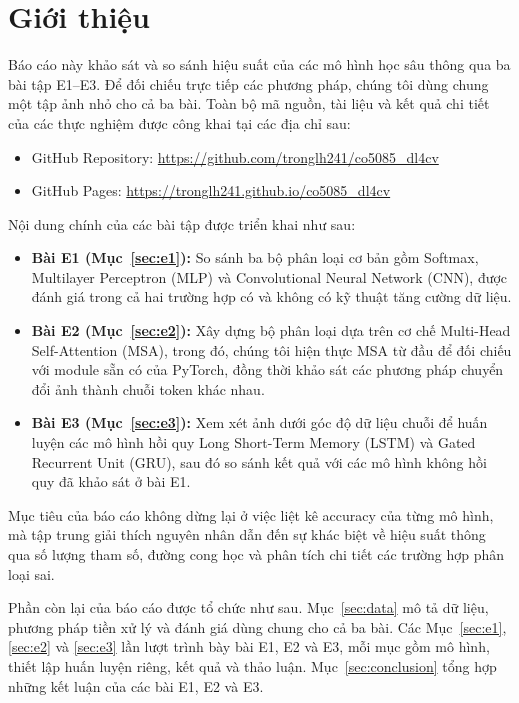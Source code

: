 \documentclass[a4paper,12pt]{article}
\begin{document}
\section{Giới thiệu}
\label{sec:intro}

Báo cáo này khảo sát và so sánh hiệu suất của các mô hình học sâu thông qua ba bài tập E1--E3. Để đối chiếu trực tiếp các phương pháp, chúng tôi dùng chung một tập ảnh nhỏ cho cả ba bài. Toàn bộ mã nguồn, tài liệu và kết quả chi tiết của các thực nghiệm được công khai tại các địa chỉ sau:
\begin{itemize}
    \item GitHub Repository: \url{https://github.com/tronglh241/co5085_dl4cv}
    \item GitHub Pages: \url{https://tronglh241.github.io/co5085_dl4cv}
\end{itemize}

Nội dung chính của các bài tập được triển khai như sau:
\begin{itemize}
    \item \textbf{Bài E1 (Mục~\ref{sec:e1}):} So sánh ba bộ phân loại cơ bản gồm Softmax, Multilayer Perceptron (MLP) và Convolutional Neural Network (CNN), được đánh giá trong cả hai trường hợp có và không có kỹ thuật tăng cường dữ liệu.
    \item \textbf{Bài E2 (Mục~\ref{sec:e2}):} Xây dựng bộ phân loại dựa trên cơ chế Multi-Head Self-Attention (MSA), trong đó, chúng tôi hiện thực MSA từ đầu để đối chiếu với module sẵn có của PyTorch, đồng thời khảo sát các phương pháp chuyển đổi ảnh thành chuỗi token khác nhau.
    \item \textbf{Bài E3 (Mục~\ref{sec:e3}):} Xem xét ảnh dưới góc độ dữ liệu chuỗi để huấn luyện các mô hình hồi quy Long Short-Term Memory (LSTM) và Gated Recurrent Unit (GRU), sau đó so sánh kết quả với các mô hình không hồi quy đã khảo sát ở bài E1.
\end{itemize}

Mục tiêu của báo cáo không dừng lại ở việc liệt kê accuracy của từng mô hình, mà tập trung giải thích nguyên nhân dẫn đến sự khác biệt về hiệu suất thông qua số lượng tham số, đường cong học và phân tích chi tiết các trường hợp phân loại sai.

Phần còn lại của báo cáo được tổ chức như sau. Mục~\ref{sec:data} mô tả dữ liệu, phương pháp tiền xử lý và đánh giá dùng chung cho cả ba bài. Các Mục~\ref{sec:e1}, \ref{sec:e2} và \ref{sec:e3} lần lượt trình bày bài E1, E2 và E3, mỗi mục gồm mô hình, thiết lập huấn luyện riêng, kết quả và thảo luận. Mục~\ref{sec:conclusion} tổng hợp những kết luận của các bài E1, E2 và E3.
\end{document}
